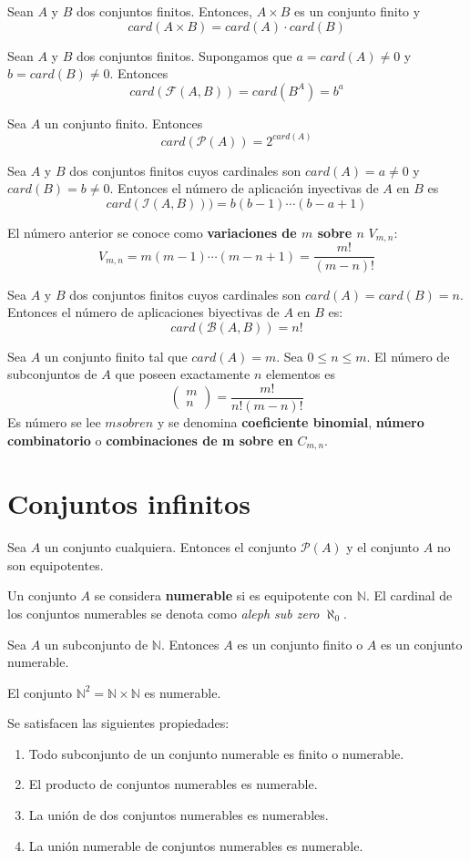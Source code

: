 Sean $A$ y $B$ dos conjuntos finitos. Entonces, $A \times B$ es un conjunto finito y
\[
card(A \times B) = card(A) \cdot card(B)
\]

Sean $A$ y $B$ dos conjuntos finitos. Supongamos que $a = card(A) \neq 0$ y $b = card(B) \neq 0$. Entonces
\[
card(\mathcal{F}(A,B))=card(B^A)=b^a
\]

Sea $A$ un conjunto finito. Entonces
\[
card(\mathcal{P}(A))=2^{card(A)}
\]

Sea $A$ y $B$ dos conjuntos finitos cuyos cardinales son $card(A) = a \neq 0$ y $card(B) = b \neq 0$. Entonces el número de aplicación inyectivas de $A$ en $B$ es
\[
card(\mathcal{I}(A,B)))=b(b-1)\cdots(b-a+1)
\]

El número anterior se conoce como \textbf{variaciones de $m$ sobre $n$} $V_{m,n}$:
\[
V_{m,n} = m(m-1)\cdots(m-n+1) = \frac{m!}{(m-n)!}
\]

Sea $A$ y $B$ dos conjuntos finitos cuyos cardinales son $card(A) = card(B) = n$. Entonces el número de aplicaciones biyectivas de $A$ en $B$ es:
\[
card(\mathcal{B}(A,B))= n!
\]

Sea $A$ un conjunto finito tal que $card(A)=m$. Sea $0 \leq n \leq m$. El número de subconjuntos de $A$ que poseen exactamente $n$ elementos es
\[
\begin{pmatrix}
m \\ n
\end{pmatrix}=
\frac{m!}{n!(m-n)!}
\]
Es número se lee $m sobre n$ y se denomina \textbf{coeficiente binomial}, \textbf{número combinatorio} o \textbf{combinaciones de m sobre en} $C_{m,n}$.

\section{Conjuntos infinitos}

Sea $A$ un conjunto cualquiera. Entonces el conjunto $\mathcal{P}(A)$ y el conjunto $A$ no son equipotentes.

Un conjunto $A$ se considera \textbf{numerable} si es equipotente con $\mathbb{N}$. El cardinal de los conjuntos numerables se denota como \emph{aleph sub zero} $\aleph_0$.

Sea $A$ un subconjunto de $\mathbb{N}$. Entonces $A$ es un conjunto finito o $A$ es un conjunto numerable. 

El conjunto $\mathbb{N}^2=\mathbb{N} \times \mathbb{N}$ es numerable.

Se satisfacen las siguientes propiedades:
\begin{enumerate}
	\item Todo subconjunto de un conjunto numerable es finito o numerable.
	\item El producto de conjuntos numerables es numerable.
	\item La unión de dos conjuntos numerables es numerables.
	\item La unión numerable de conjuntos numerables es numerable.
\end{enumerate}

